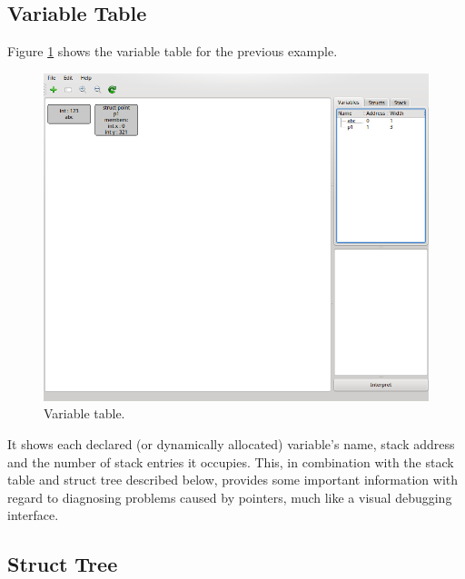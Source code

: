 \documentclass[a4paper,11pt]{article}
\begin{document}
\subsection{Variable Table}

Figure \ref{fig:variabletable1} shows the variable table for the previous example.
\begin{figure}[h!]
\centering
\includegraphics[trim=460 300 0 35,clip]{variabletable1}
\caption{Variable table.}
\label{fig:variabletable1}
\end{figure}
It shows each declared (or dynamically allocated) variable's name, stack address and the number of stack entries it occupies.
This, in combination with the stack table and struct tree described below, provides some important information with regard to diagnosing problems caused by pointers, much like a visual debugging interface.

\subsection{Struct Tree}
\end{document}
